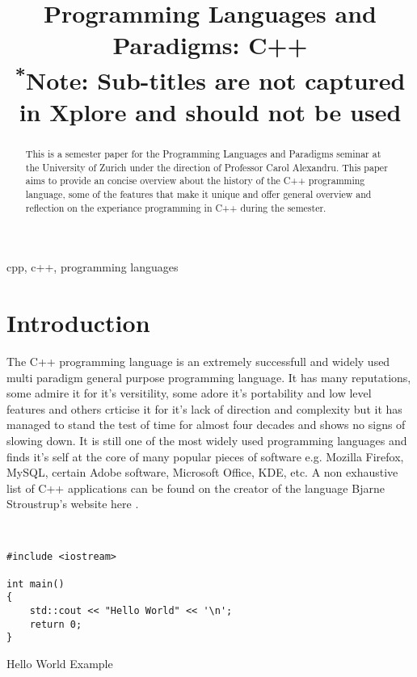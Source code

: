 \documentclass[conference, a4paper]{IEEEtran}
\begin{document}
\title{Programming Languages and Paradigms: C++\\
{\footnotesize \textsuperscript{*}Note: Sub-titles are not captured in Xplore and
should not be used}
}

\author{
}


\maketitle

\begin{abstract}
This is a semester paper for the Programming Languages and Paradigms seminar at the University of Zurich under the direction of Professor Carol Alexandru. This paper aims to provide an concise overview about the history of the C++ programming language, some of the features that make it unique and offer general overview and reflection on the experiance programming in C++ during the semester.\\
\end{abstract}

\begin{IEEEkeywords}
cpp, c++, programming languages
\end{IEEEkeywords}

\section{Introduction}
The C++ programming language is an extremely successfull and widely used multi paradigm general purpose programming language. It has many reputations, some admire it for it's versitility, some adore it's portability and low level features and others crticise it for it's lack of direction and complexity but it has managed to stand the test of time for almost four decades and shows no signs of slowing down. It is still one of the most widely used programming languages and finds it's self at the core of many popular pieces of software e.g. Mozilla Firefox, MySQL, certain Adobe software, Microsoft Office, KDE, etc. A non exhaustive list of C++ applications can be found on the creator of the language Bjarne Stroustrup's website here \cite{cppapplications} .

\begin{listing}[h]
    
\begin{verbatim}


#include <iostream>

int main()
{
    std::cout << "Hello World" << '\n';
    return 0;
}
\end{verbatim}
\caption{Hello World Example}
\label{listing:1}
\end{listing}
\end{document}
